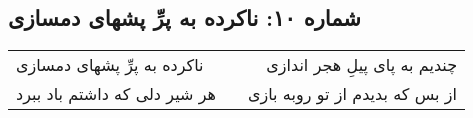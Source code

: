 \begin{center}
\section*{شماره ۱۰: ناکرده به پرِّ پشهای دمسازی}
\label{sec:010}
\begin{longtable}{l p{0.5cm} r}
ناکرده به پرِّ پشهای دمسازی
&&
چندیم به پای پیلِ هجر اندازی
\\
هر شیر دلی که داشتم باد ببرد
&&
از بس که بدیدم از تو روبه بازی
\\
\end{longtable}
\end{center}
